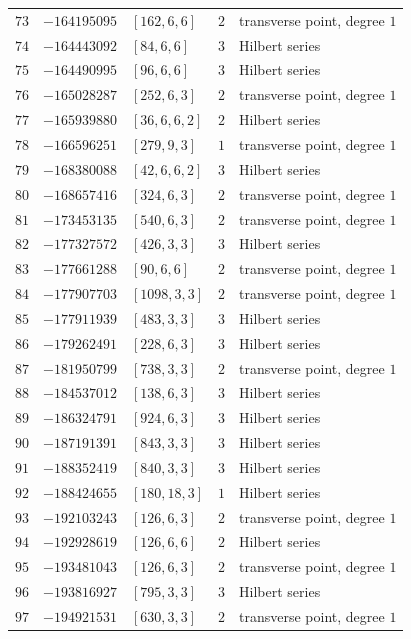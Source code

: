 \documentclass[11pt]{article}
\begin{document}
\begin{center}
\begin{longtable}{r r l c l}
$73$ & $-164195095$ & $[162,6,6]$ & $2$ & transverse point, degree $1$\\
$74$ & $-164443092$ & $[84,6,6]$ & $3$ & Hilbert series\\
$75$ & $-164490995$ & $[96,6,6]$ & $3$ & Hilbert series\\
$76$ & $-165028287$ & $[252,6,3]$ & $2$ & transverse point, degree $1$\\
$77$ & $-165939880$ & $[36,6,6,2]$ & $2$ & Hilbert series\\
$78$ & $-166596251$ & $[279,9,3]$ & $1$ & transverse point, degree $1$\\
$79$ & $-168380088$ & $[42,6,6,2]$ & $3$ & Hilbert series\\
$80$ & $-168657416$ & $[324,6,3]$ & $2$ & transverse point, degree $1$\\
$81$ & $-173453135$ & $[540,6,3]$ & $2$ & transverse point, degree $1$\\
$82$ & $-177327572$ & $[426,3,3]$ & $3$ & Hilbert series\\
$83$ & $-177661288$ & $[90,6,6]$ & $2$ & transverse point, degree $1$\\
$84$ & $-177907703$ & $[1098,3,3]$ & $2$ & transverse point, degree $1$\\
$85$ & $-177911939$ & $[483,3,3]$ & $3$ & Hilbert series\\
$86$ & $-179262491$ & $[228,6,3]$ & $3$ & Hilbert series\\
$87$ & $-181950799$ & $[738,3,3]$ & $2$ & transverse point, degree $1$\\
$88$ & $-184537012$ & $[138,6,3]$ & $3$ & Hilbert series\\
$89$ & $-186324791$ & $[924,6,3]$ & $3$ & Hilbert series\\
$90$ & $-187191391$ & $[843,3,3]$ & $3$ & Hilbert series\\
$91$ & $-188352419$ & $[840,3,3]$ & $3$ & Hilbert series\\
$92$ & $-188424655$ & $[180,18,3]$ & $1$ & Hilbert series\\
$93$ & $-192103243$ & $[126,6,3]$ & $2$ & transverse point, degree $1$\\
$94$ & $-192928619$ & $[126,6,6]$ & $2$ & Hilbert series\\
$95$ & $-193481043$ & $[126,6,3]$ & $2$ & transverse point, degree $1$\\
$96$ & $-193816927$ & $[795,3,3]$ & $3$ & Hilbert series\\
$97$ & $-194921531$ & $[630,3,3]$ & $2$ & transverse point, degree $1$\\

\end{longtable}
\end{center}
\end{document}
